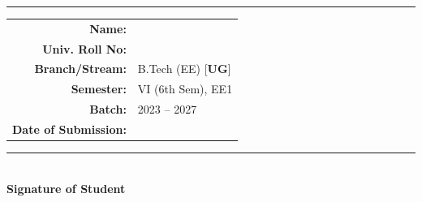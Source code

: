 \documentclass[12pt, a4paper]{article}
\begin{document}
        \begin{center}
		\vspace{0.02cm}
		\rule{\textwidth}{2pt} %
		\vspace{0.02cm}
		
		\renewcommand{\arraystretch}{1.5} %
		\begin{tabular}{r l}
			\large \faUser \hspace{0.2cm} \textbf{Name:} & \large \hspace{0.5cm} \\ %
			
			\large \faIdCard \hspace{0.2cm} \textbf{Univ. Roll No:} & \large \hspace{0.5cm} \\ %
			
			\large \faCodeBranch \hspace{0.2cm} \textbf{Branch/Stream:} & \large \hspace{0.5cm} B.Tech (EE) \hspace{0.5cm} [\textbf{UG}] \\
			
			\large \faLayerGroup \hspace{0.2cm} \textbf{Semester:} & \large \hspace{0.5cm} VI (6th Sem), EE1 \\
			
			\large \faUsers \hspace{0.2cm} \textbf{Batch:} & \large \hspace{0.5cm} 2023 -- 2027 \\
			
			\large \faCalendarCheck \hspace{0.2cm} \textbf{Date of Submission:} & \large \hspace{0.5cm} \\ %
		\end{tabular}
		
	\end{center}
	
	
	\begin{flushright}
		\vspace{0.1cm}
		\rule{5cm}{0.5pt} \\
		\textbf{Signature of Student}
	\end{flushright}
	
\end{document}
